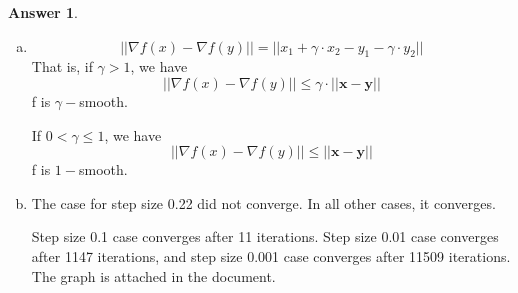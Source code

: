 \documentclass{article}
\theoremstyle{definition}
\newtheorem{ans}{Answer}
\begin{document}
	\begin{ans}
		\begin{enumerate}[(a)]
			\item $$||\nabla f(x)-\nabla f(y)||=||x_1+\gamma\cdot x_2-y_1-\gamma\cdot y_2||
			$$
			That is, if $\gamma>1$, we have $$||\nabla f(x)-\nabla f(y)||\leq \gamma\cdot||\boldsymbol{x}-\boldsymbol{y}||$$
			f is $\gamma-$smooth. 
			
			If $0<\gamma\leq1$, we have $$||\nabla f(x)-\nabla f(y)||\leq ||\boldsymbol{x}-\boldsymbol{y}||$$
			f is $1-$smooth. 
			\item The case for step size 0.22 did not converge. In all other cases, it converges. 
			
			Step size 0.1 case converges after 11 iterations. Step size 0.01 case converges after 1147 iterations, and step size 0.001 case converges after 11509 iterations. The graph is attached in the document.
			

\end{enumerate}
\end{ans}
\end{document}
